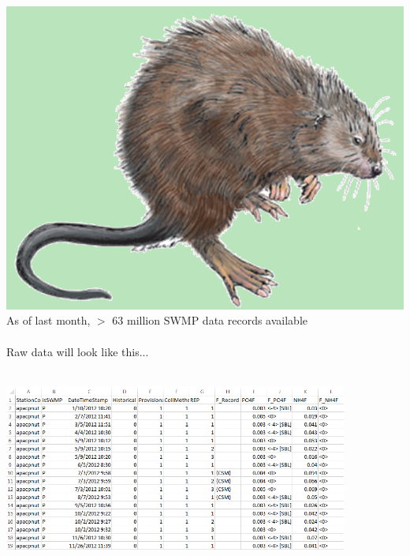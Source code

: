 \documentclass[serif]{beamer}\usepackage[]{graphicx}\usepackage[]{color}
\begin{document}
\begin{frame}[t]{\includegraphics[width=0.05\paperwidth]{fig/muskrat.png}\hspace{0.07in}{\bf What is NERRS/SWMP?}}
As of last month, $>$ 63 million SWMP  data records available \\~\\
Raw data will look like this...\\~\\
\centerline{\includegraphics[width = 0.85\textwidth]{fig/qaqc_ex.png}}
\end{frame}
\end{document}

